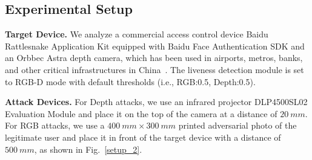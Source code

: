 \begin{table}[pt]
	\caption{Attack Effectiveness of \texttt{DepthFake} on a Commercial Access Control Device}
	\begin{center}
		\label{commercial_asr}
	\end{center}
	\vspace{-0.15in}
\end{table}

\subsection{Experimental Setup}
\textbf{Target Device.} We analyze a commercial access control device Baidu Rattlesnake Application Kit equipped with Baidu Face Authentication SDK and an Orbbec Astra depth camera, which has been used in airports, metros, banks, and other critical infrastructures in China~\cite{baidu_customer}.
The liveness detection module is set to RGB-D mode with default thresholds  (i.e., RGB:0.5, Depth:0.5).

\textbf{Attack Devices.} For Depth attacks, we use an infrared projector DLP4500SL02 Evaluation Module and place it on the top of the camera at a distance of $20~mm$. For RGB attacks, we use a $400~mm\times300~mm$ printed adversarial photo of the legitimate user and place it in front of the target device with a distance of $500~mm$, as shown in Fig.~\ref{setup_2}.


